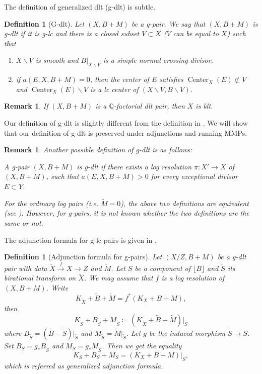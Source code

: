 \documentclass[11pt]{amsart}
\newcommand{\Qq}{\mathbb{Q}}
\newcommand{\Center}{\operatorname{Center}}
\newtheorem{definition}[theorem]{Definition}
\newtheorem{remark}[theorem]{Remark}
\begin{document}
The definition of generalized dlt (g-dlt) is subtle. 
\begin{definition}[G-dlt]\label{def:g-dlt}
Let $(X,B+M)$ be a g-pair. We say that $(X,B+M)$ is \emph{g-dlt} if it is g-lc and there is a closed subset $V\subset X$ ($V$ can be equal to $X$) such that
\begin{enumerate}
\item $X\backslash V$ is smooth and $B|_{X\backslash V}$ is a simple normal crossing divisor,
\item if $a(E, X, B+M)=0$, then the center of $E$ satisfies $\Center_X(E) \not\subset V$ and $\Center_X(E)\backslash V$ is a lc center of $(X\backslash V, B\backslash V)$.
\end{enumerate}
\end{definition}
\begin{remark}\label{rmk: klt}
 If $(X,B+M)$ is a $\Qq$-factorial dlt pair, then $X$ is klt.
\end{remark}

Our definition of g-dlt is slightly different from the definition in \cite[page 13]{Bir16a}. We will show that our definition of g-dlt is preserved under adjunctions and running MMPs. 
\begin{remark}\label{rmk: dlt}
	Another possible definition of g-dlt is as follows: 
	
	A g-pair $(X,B+M)$ is g-dlt if there exists a log resolution $\pi: X'\to X$ of $(X,B+M)$, such that $a(E,X,B+M)>0$ for every exceptional divisor $E\subset Y$.
	
	For the ordinary log pairs (i.e. $\tilde M=0$), the above two definitions are equivalent (see \cite[Theorem 2.44]{KM98}). However, for g-pairs, it is not known whether the two definitions are the same or not.
\end{remark}




The adjunction formula for g-lc pairs is given in \cite[Definition 4.7]{BZ16}. 

\begin{definition}[Adjunction formula for g-pairs]\label{def: g-adjunction}
	Let $(X/Z,B+M)$ be a g-dlt pair with data $\tilde X \xrightarrow{f} X \to Z$ and $\tilde M$. Let $S$ be a component of $\lfloor B \rfloor$ and $\tilde S$ its birational transform on $\tilde X$. We may assume that $f$ is a log resolution of $(X,B+M)$. Write 
	\[
	K_{\tilde X} +\tilde B+\tilde M=f^*(K_{X} +B +M),
	\] then
	\[
	K_{\tilde S} +B_{\tilde S} +M_{\tilde S} \coloneqq (K_{\tilde X} +\tilde B+\tilde M)|_{\tilde S}
	\]
	where $B_{\tilde S} = (\tilde B-\tilde S)|_{\tilde S}$ and $M_{\tilde S} =\tilde M|_{\tilde S}$. Let $g$ be the induced morphism $\tilde S\to S$. Set $B_{S} = g_*B_{\tilde S}$ and $M_{S} =g_*M_{\tilde S}$. Then we get the equality
	\[
	K_{S}+B_{S}+M_{S} = (K_{X}+B+M)|_{S},
	\] which is referred as \emph{generalized adjunction formula}.
\end{definition}
	
\end{document}
